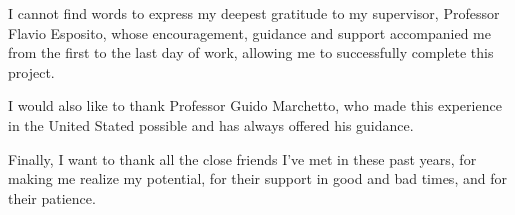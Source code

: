 \begin{acknowledgements}
I cannot find words to express my deepest gratitude to my supervisor, Professor Flavio Esposito, whose encouragement, guidance and support accompanied me from the first to the last day of work, allowing me to successfully complete this project.

I would also like to thank Professor Guido Marchetto, who made this experience in the United Stated possible and has always offered his guidance.

Finally, I want to thank all the close friends I've met in these past years, for making me realize my potential, for their support in good and bad times, and for their patience.
\end{acknowledgements}